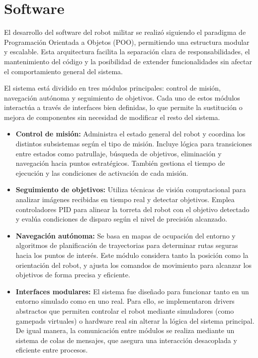 \section{Software}

El desarrollo del software del robot militar se realizó siguiendo el paradigma de Programación Orientada a Objetos (POO), permitiendo una estructura modular y escalable. Esta arquitectura facilita la separación clara de responsabilidades, el mantenimiento del código y la posibilidad de extender funcionalidades sin afectar el comportamiento general del sistema.

El sistema está dividido en tres módulos principales: control de misión, navegación autónoma y seguimiento de objetivos. Cada uno de estos módulos interactúa a través de interfaces bien definidas, lo que permite la sustitución o mejora de componentes sin necesidad de modificar el resto del sistema.

\begin{itemize}
    \item \textbf{Control de misión:} Administra el estado general del robot y coordina los distintos subsistemas según el tipo de misión. Incluye lógica para transiciones entre estados como patrullaje, búsqueda de objetivos, eliminación y navegación hacia puntos estratégicos. También gestiona el tiempo de ejecución y las condiciones de activación de cada misión.

    \item \textbf{Seguimiento de objetivos:} Utiliza técnicas de visión computacional para analizar imágenes recibidas en tiempo real y detectar objetivos. Emplea controladores PID para alinear la torreta del robot con el objetivo detectado y evalúa condiciones de disparo según el nivel de precisión alcanzado.

    \item \textbf{Navegación autónoma:} Se basa en mapas de ocupación del entorno y algoritmos de planificación de trayectorias para determinar rutas seguras hacia los puntos de interés. Este módulo considera tanto la posición como la orientación del robot, y ajusta los comandos de movimiento para alcanzar los objetivos de forma precisa y eficiente.

    \item \textbf{Interfaces modulares:} El sistema fue diseñado para funcionar tanto en un entorno simulado como en uno real. Para ello, se implementaron drivers abstractos que permiten controlar el robot mediante simuladores (como gamepads virtuales) o hardware real sin alterar la lógica del sistema principal. De igual manera, la comunicación entre módulos se realiza mediante un sistema de colas de mensajes, que asegura una interacción desacoplada y eficiente entre procesos.

\end{itemize}

